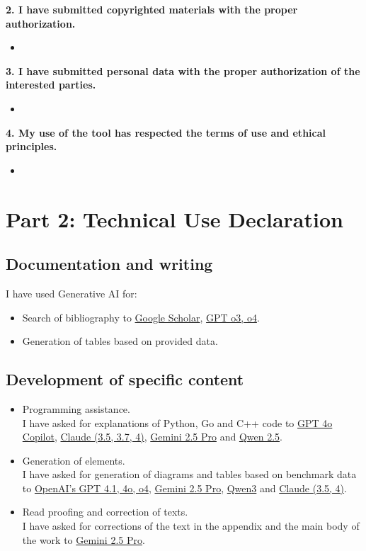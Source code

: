 \textbf{2. I have submitted copyrighted materials with the proper authorization.}
\begin{itemize}
  \item[] 
\end{itemize}

\textbf{3. I have submitted personal data with the proper authorization of the interested parties.}
\begin{itemize}
  \item[] 
\end{itemize}

\textbf{4. My use of the tool has respected the terms of use and ethical principles.}
\begin{itemize}
  \item[] 
\end{itemize}


\section*{Part 2: Technical Use Declaration}


\subsection*{Documentation and writing}
I have used Generative AI for:
\begin{itemize}
  \item Search of bibliography to \href{https://www.google.com}{Google Scholar}, \href{https://openai.com}{GPT o3, o4}.
  \item Generation of tables based on provided data.
\end{itemize}

\subsection*{Development of specific content}
\begin{itemize}
  \item Programming assistance. \\
  I have asked for explanations of Python, Go and C++ code to \href{https://openai.com}{GPT 4o Copilot}, \href{https://www.anthropic.com/api}{Claude (3.5, 3.7, 4)}, \href{https://deepmind.google/models/gemini/pro/}{Gemini 2.5 Pro} and \href{https://qwenlm.github.io/}{Qwen 2.5}.

  \item Generation of elements. \\
  I have asked for generation of diagrams and tables based on benchmark data to \href{https://openai.com}{OpenAI's GPT 4.1, 4o, o4}, \href{https://deepmind.google/models/gemini/pro/}{Gemini 2.5 Pro}, \href{https://qwenlm.github.io/}{Qwen3} and \href{https://www.anthropic.com/api}{Claude (3.5, 4)}.

  \item Read proofing and correction of texts. \\
  I have asked for corrections of the text in the appendix and the main body of the work to \href{https://openai.com}{Gemini 2.5 Pro}.
\end{itemize}

